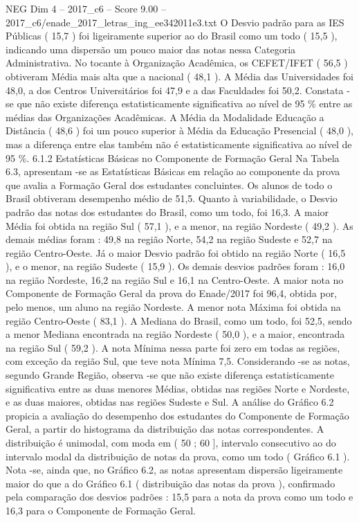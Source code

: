 \begin{textsample}{NEG Dim 4 – 2017\_c6 – Score 9.00 – 2017\_c6/enade\_2017\_letras\_ing\_ee342011e3.txt}
O Desvio padrão para as IES Públicas ( 15,7 ) foi ligeiramente superior ao do Brasil como um todo ( 15,5 ), indicando uma dispersão um pouco maior das notas nessa Categoria Administrativa.
No tocante à Organização Acadêmica, os CEFET/IFET ( 56,5 ) obtiveram Média mais alta que a nacional ( 48,1 ).
A Média das Universidades foi 48,0, a dos Centros Universitários foi 47,9 e a das Faculdades foi 50,2.
Constata -se que não existe diferença estatisticamente significativa ao nível de 95 \% entre as médias das Organizações Acadêmicas.
A Média da Modalidade Educação a Distância ( 48,6 ) foi um pouco superior à Média da Educação Presencial ( 48,0 ), mas a diferença entre elas também não é estatisticamente significativa ao nível de 95 \%. 6.1.2 Estatísticas Básicas no Componente de Formação Geral Na Tabela 6.3, apresentam -se as Estatísticas Básicas em relação ao componente da prova que avalia a Formação Geral dos estudantes concluintes.
Os alunos de todo o Brasil obtiveram desempenho médio de 51,5.
Quanto à variabilidade, o Desvio padrão das notas dos estudantes do Brasil, como um todo, foi 16,3.
A maior Média foi obtida na região Sul ( 57,1 ), e a menor, na região Nordeste ( 49,2 ).
As demais médias foram : 49,8 na região Norte, 54,2 na região Sudeste e 52,7 na região Centro-Oeste.
Já o maior Desvio padrão foi obtido na região Norte ( 16,5 ), e o menor, na região Sudeste ( 15,9 ).
Os demais desvios padrões foram : 16,0 na região Nordeste, 16,2 na região Sul e 16,1 na Centro-Oeste.
A maior nota no Componente de Formação Geral da prova do Enade/2017 foi 96,4, obtida por, pelo menos, um aluno na região Nordeste.
A menor nota Máxima foi obtida na região Centro-Oeste ( 83,1 ).
A Mediana do Brasil, como um todo, foi 52,5, sendo a menor Mediana encontrada na região Nordeste ( 50,0 ), e a maior, encontrada na região Sul ( 59,2 ).
A nota Mínima nessa parte foi zero em todas as regiões, com exceção da região Sul, que teve nota Mínima 7,5.
Considerando -se as notas, segundo Grande Região, observa -se que não existe diferença estatisticamente significativa entre as duas menores Médias, obtidas nas regiões Norte e Nordeste, e as duas maiores, obtidas nas regiões Sudeste e Sul.
A análise do Gráfico 6.2 propicia a avaliação do desempenho dos estudantes do Componente de Formação Geral, a partir do histograma da distribuição das notas correspondentes.
A distribuição é unimodal, com moda em ( 50 ; 60 ], intervalo consecutivo ao do intervalo modal da distribuição de notas da prova, como um todo ( Gráfico 6.1 ).
Nota -se, ainda que, no Gráfico 6.2, as notas apresentam dispersão ligeiramente maior do que a do Gráfico 6.1 ( distribuição das notas da prova ), confirmado pela comparação dos desvios padrões : 15,5 para a nota da prova como um todo e 16,3 para o Componente de Formação Geral.

\end{textsample}

